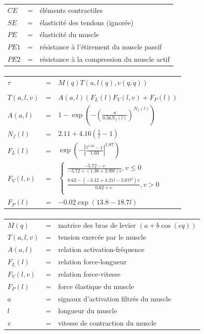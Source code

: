 \documentclass[pdftex,a4paper,11pt]{article}
\begin{document}
\begin{tabular}{lcl}
    $CE$  & = & éléments contractiles \\
    $SE$  & = & élasticité des tendons (ignorée) \\
    $PE$  & = & élasticité du muscle \\
    $PE1$ & = & résistance à l'étirement du muscle passif \\
    $PE2$ & = & résistance à la compression du muscle actif \\
\end{tabular}

\paragraph{}
\begin{tabular}{lcl}
    $\tau$ & = & $M(q) T(a, l(q), v(q, \dot{q}))$ \\
    \\
    $T(a, l, v)$ & = & $A(a,l)(F_L(l) F_V(l,v) + F_P(l))$ \\
    $A(a, l)$    & = & $1 - \exp \left(- \left(\frac{a}{0.56 N_f(l)}\right)^{N_f(l)}\right)$ \\
    $N_f(l)$     & = & $2.11 + 4.16 \left(\frac{1}{l} - 1\right)$ \\
    $F_L(l)$     & = & $\exp \left(-\left|\frac{l^{1.93} - 1}{1.03}\right|^{1.87}\right)$ \\
    $F_V(l, v)$  & = & $\left\{ 
        \begin{array}{l}
            \frac{-5.72 - v}{-5.72 + (1.38 + 2.09 l) v}, v \leq 0 \\
            \frac{0.62 - \left(-3.12 + 4.21 l - 2.67 l^2\right) v}{0.62 + v}, v > 0 \\
        \end{array}
        \right.$ \\
    $F_P(l)$     & = & $-0.02 \exp(13.8 - 18.7 l)$ \\
\end{tabular}

\paragraph{}
\begin{tabular}{lcl}
    $M(q)$  & = & matrice des bras de levier $(a + b \cos (c q))$ \\
    $T(a, l, v)$ & = & tension exercée par le muscle \\
    $A(a, l)$    & = & relation activation-fréquence \\
    $F_L(l)$     & = & relation force-longueur \\
    $F_V(l, v)$  & = & relation force-vitesse \\
    $F_P(l)$     & = & force élastique du muscle \\ %
    $a$          & = & signaux d'activation filtrés du muscle \\
    $l$          & = & longueur du muscle \\
    $v$          & = & vitesse de contraction du muscle \\
\end{tabular}
\end{document}

